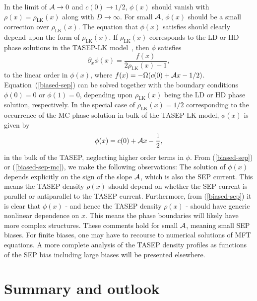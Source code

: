 \documentclass[aps,pre,twocolumn,superscriptaddress,amsmath,amssymb,longbibliography,floatfix,nofootinbib]{revtex4}
\begin{document}
{{In the limit of $ {\cal A}\rightarrow 0$ and $c(0)\rightarrow 1/2$, $\phi(x)$ should vanish with $\rho (x)=\rho_\text{LK}(x)$ along with $D\rightarrow \infty$. For small $\cal A$, $\phi(x)$ should be a small correction over $\rho_\text{LK}(x)$. 
The equation that $\phi(x)$ satisfies should clearly depend upon the form of $\rho_\text{LK}(x)$. If  $\rho_\text{LK}(x)$ corresponds to the LD or HD phase solutions in the TASEP-LK model~\cite{frey-lktasep}, then $\phi$ satisfies
\begin{equation}
 \partial_x \phi(x)= \frac{f(x)}{2\rho_\text{LK}(x) -1},\label{biased-sep}
\end{equation}
to the linear order in $\phi(x)$,
where $f(x)=-\Omega(c(0)+ {\cal A}x - 1/2)$. Equation~(\ref{biased-sep}) can be solved together with the boundary conditions $\phi(0)=0$ or $\phi(1)=0$, depending upon $\rho_\text{LK}(x)$ being the LD or HD phase solution, respectively. In the special case of $\rho_\text{LK}(x)=1/2$ corresponding to the occurrence of the MC phase solution in bulk of the TASEP-LK model, $\phi(x)$ is given by
\begin{equation}
 \phi(x)=c(0)+ {\cal A}x - \frac{1}{2},\label{biased-sep-mc}
\end{equation}
in the bulk of the TASEP, neglecting higher order terms in $\phi$. 
From (\ref{biased-sep}) or (\ref{biased-sep-mc}), we make the following observations: 
The solution of $\phi(x)$ depends explicitly on the sign of the slope $\cal A$, which is also the SEP current. This means the TASEP density $\rho(x)$ should depend on whether the SEP current is parallel or antiparallel to the TASEP current. Furthermore, from (\ref{biased-sep}) it is clear that $\phi(x)$ - and hence the TASEP density $\rho(x)$ -  should have generic nonlinear dependence on $x$. This means the phase boundaries will likely have more complex structures. These comments hold for small $\cal A$, meaning small SEP biases. For finite biases, one may have to recourse to numerical solutions of MFT equations.  A more complete analysis of the TASEP density profiles as functions of the SEP bias including large biases will be presented elsewhere. 



}




\section{Summary and outlook}\label{summ}

}
\end{document}
